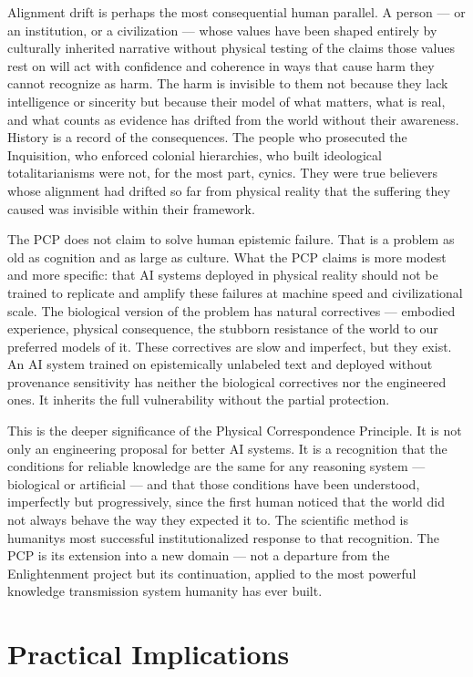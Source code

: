 \documentclass[12pt]{article}
\begin{document}
Alignment drift is perhaps the most consequential human parallel. A
person --- or an institution, or a civilization --- whose values have
been shaped entirely by culturally inherited narrative without physical
testing of the claims those values rest on will act with confidence and
coherence in ways that cause harm they cannot recognize as harm. The
harm is invisible to them not because they lack intelligence or
sincerity but because their model of what matters, what is real, and
what counts as evidence has drifted from the world without their
awareness. History is a record of the consequences. The people who
prosecuted the Inquisition, who enforced colonial hierarchies, who built
ideological totalitarianisms were not, for the most part, cynics. They
were true believers whose alignment had drifted so far from physical
reality that the suffering they caused was invisible within their
framework.

The PCP does not claim to solve human epistemic failure. That is a
problem as old as cognition and as large as culture. What the PCP claims
is more modest and more specific: that AI systems deployed in physical
reality should not be trained to replicate and amplify these failures at
machine speed and civilizational scale. The biological version of the
problem has natural correctives --- embodied experience, physical
consequence, the stubborn resistance of the world to our preferred
models of it. These correctives are slow and imperfect, but they exist.
An AI system trained on epistemically unlabeled text and deployed
without provenance sensitivity has neither the biological correctives
nor the engineered ones. It inherits the full vulnerability without the
partial protection.

This is the deeper significance of the Physical Correspondence
Principle. It is not only an engineering proposal for better AI systems.
It is a recognition that the conditions for reliable knowledge are the
same for any reasoning system --- biological or artificial --- and that
those conditions have been understood, imperfectly but progressively,
since the first human noticed that the world did not always behave the
way they expected it to. The scientific method is
humanity\textquotesingle s most successful institutionalized response to
that recognition. The PCP is its extension into a new domain --- not a
departure from the Enlightenment project but its continuation, applied
to the most powerful knowledge transmission system humanity has ever
built.

\section{Practical Implications}\label{practical-implications}
\end{document}
